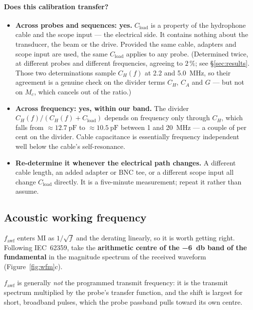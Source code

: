 \documentclass[11pt,a4paper]{article}
\newcommand{\caveat}[1]{\textcolor{orange!75!black}{\textbf{#1}}}
\begin{document}
\paragraph{Does this calibration transfer?}
\begin{itemize}
  \item \textbf{Across probes and sequences: yes.} $C_\mathrm{load}$ is a property of the hydrophone
    cable and the scope input --- the electrical side. It contains nothing about the transducer, the
    beam or the drive. Provided the same cable, adapters and scope input are used, the same
    $C_\mathrm{load}$ applies to any probe. (Determined twice, at different probes and different
    frequencies, agreeing to $2\,\%$; see \S\ref{sec:results}. Those two determinations sample
    $C_H(f)$ at \SI{2.2}{} and \SI{5.0}{\mega\hertz}, so their agreement is a genuine check on the
    divider terms $C_H$, $C_A$ and $G$ --- but not on $M_c$, which cancels out of the ratio.)
  \item \textbf{Across frequency: yes, within our band.} The divider
    $C_H(f)/(C_H(f)+C_\mathrm{load})$ depends on frequency only through $C_H$, which falls from
    $\approx\SI{12.7}{\pico\farad}$ to $\approx\SI{10.5}{\pico\farad}$ between \SI{1}{} and
    \SI{20}{\mega\hertz} --- a couple of per cent on the divider. Cable capacitance is essentially
    frequency independent well below the cable's self-resonance.
  \item \caveat{Re-determine it whenever the electrical path changes.} A different cable length, an
    added adapter or BNC tee, or a different scope input all change $C_\mathrm{load}$ directly. It is
    a five-minute measurement; repeat it rather than assume.
\end{itemize}

\subsection{Acoustic working frequency}\label{sec:fawf}
$f_\mathrm{awf}$ enters MI as $1/\sqrt{f}$ and the derating linearly, so it is worth getting right.
Following IEC~62359, take the \textbf{arithmetic centre of the \SI{-6}{\decibel} band of the
fundamental} in the magnitude spectrum of the received waveform (Figure~\ref{fig:wfm}c).

$f_\mathrm{awf}$ is generally \emph{not} the programmed transmit frequency: it is the transmit
spectrum multiplied by the probe's transfer function, and the shift is largest for short, broadband
pulses, which the probe passband pulls toward its own centre.
\end{document}
